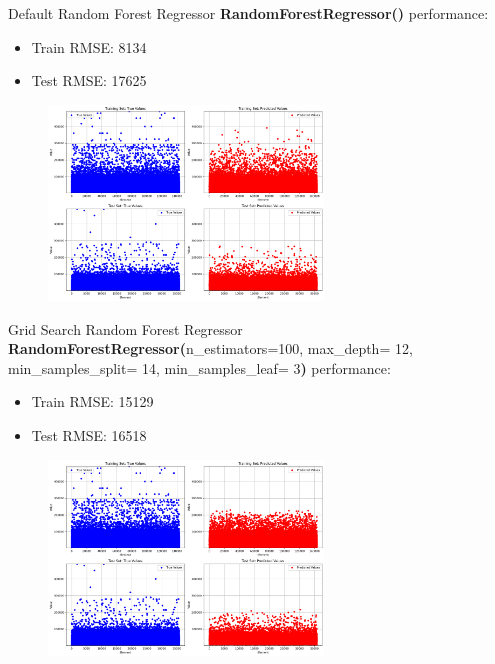 \documentclass{beamer}
\begin{document}
\begin{frame}{Default Random Forest Regressor}
\textbf{RandomForestRegressor()} performance:
        \begin{itemize}
            \item Train RMSE: 8134
            \item Test RMSE: 17625
        \end{itemize}
    \begin{figure}
        \centering
        \includegraphics[width=0.65\textwidth]{images/RFR_default_plot2.png}
    \end{figure}
\end{frame}

\begin{frame}{Grid Search Random Forest Regressor}
\textbf{RandomForestRegressor(}n\_estimators=100, max\_depth= 12, min\_samples\_split= 14, min\_samples\_leaf= 3\textbf{)} performance:
        \begin{itemize}
            \item Train RMSE: 15129
            \item Test RMSE: 16518
        \end{itemize}
    \begin{figure}
        \centering
        \includegraphics[width=0.65\textwidth]{images/GSRFR_plot2.png}
    \end{figure}
\end{frame}
\end{document}
